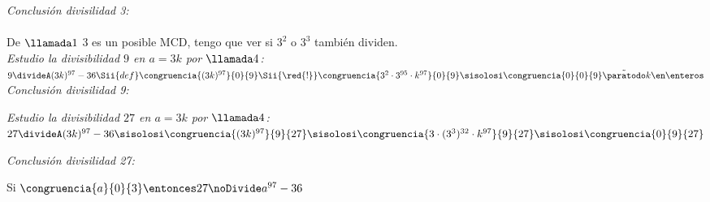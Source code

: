 \textit{Conclusión divisilidad 3: }\\
\\

De $\llamada1$ 3 es un posible MCD, tengo que ver si $3^2$ o $3^3$ también dividen.\\

\textit{Estudio la divisibilidad $9$ en $a = 3k$ por $\llamada4$:}\\
$ 9 \divideA (3k)^{97} - 36
    \Sii{def}
    \congruencia{(3k)^{97}}{0}{9}
    \Sii{\red{!}}
    \congruencia{3^2 \cdot 3^{95}\cdot k^{97}}{0}{9}
    \sisolosi
	\congruencia{0}{0}{9}\Tilde \paratodo k \en \enteros 
$\\

\textit{Conclusión divisilidad 9: }\\
\Tilde


\textit{Estudio la divisibilidad $27$ en $a = 3k$ por $\llamada4$:}\\
$ 27 \divideA (3k)^{97} - 36
	\sisolosi
    \congruencia{(3k)^{97}}{9}{27}
	\sisolosi
    \congruencia{3 \cdot (3^3)^{32} \cdot k^{97}}{9}{27}
    \sisolosi
    \congruencia{0}{9}{27} 
$

\textit{Conclusión divisilidad 27: }

Si $\congruencia{a}{0}{3} \entonces 27 \noDivide a^{97} - 36$


\begin{aportes}
  \item {}
	\item {}
\end{aportes}
